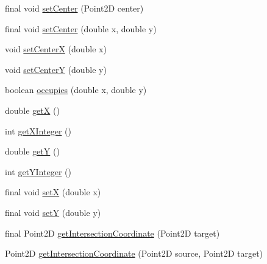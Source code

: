 \begin{DoxyCompactItemize}
\item 
final void \hyperlink{classorg_1_1tzi_1_1use_1_1gui_1_1views_1_1diagrams_1_1elements_1_1_placeable_node_aba9a1a5c62c3a4884918d943f66138fa}{set\-Center} (Point2\-D center)
\item 
final void \hyperlink{classorg_1_1tzi_1_1use_1_1gui_1_1views_1_1diagrams_1_1elements_1_1_placeable_node_ac8b271927328def828f3799aa3cccea7}{set\-Center} (double x, double y)
\item 
void \hyperlink{classorg_1_1tzi_1_1use_1_1gui_1_1views_1_1diagrams_1_1elements_1_1_placeable_node_ae77728c5033a4d84494bebf3216f273a}{set\-Center\-X} (double x)
\item 
void \hyperlink{classorg_1_1tzi_1_1use_1_1gui_1_1views_1_1diagrams_1_1elements_1_1_placeable_node_a402c26ca8766f236e79b091798a827a7}{set\-Center\-Y} (double y)
\item 
boolean \hyperlink{classorg_1_1tzi_1_1use_1_1gui_1_1views_1_1diagrams_1_1elements_1_1_placeable_node_a5f958afb2688448b1a1eedc1a32d1ad3}{occupies} (double x, double y)
\item 
double \hyperlink{classorg_1_1tzi_1_1use_1_1gui_1_1views_1_1diagrams_1_1elements_1_1_placeable_node_a9896f7614afee00b458f36f31844c5c4}{get\-X} ()
\item 
int \hyperlink{classorg_1_1tzi_1_1use_1_1gui_1_1views_1_1diagrams_1_1elements_1_1_placeable_node_aff7606ef1a9552fbf84cea3d77d76250}{get\-X\-Integer} ()
\item 
double \hyperlink{classorg_1_1tzi_1_1use_1_1gui_1_1views_1_1diagrams_1_1elements_1_1_placeable_node_a07031d68a4c5db1c981ab2ae736ac5c9}{get\-Y} ()
\item 
int \hyperlink{classorg_1_1tzi_1_1use_1_1gui_1_1views_1_1diagrams_1_1elements_1_1_placeable_node_af8294cc538ac4dd10d354fded4fde9ba}{get\-Y\-Integer} ()
\item 
final void \hyperlink{classorg_1_1tzi_1_1use_1_1gui_1_1views_1_1diagrams_1_1elements_1_1_placeable_node_a738326154df6bbd276c04af778870a2f}{set\-X} (double x)
\item 
final void \hyperlink{classorg_1_1tzi_1_1use_1_1gui_1_1views_1_1diagrams_1_1elements_1_1_placeable_node_a621d044c7519c5d209bed0b328de73ea}{set\-Y} (double y)
\item 
final Point2\-D \hyperlink{classorg_1_1tzi_1_1use_1_1gui_1_1views_1_1diagrams_1_1elements_1_1_placeable_node_a276db8db4bac826bb36b93d34ffdc62d}{get\-Intersection\-Coordinate} (Point2\-D target)
\item 
Point2\-D \hyperlink{classorg_1_1tzi_1_1use_1_1gui_1_1views_1_1diagrams_1_1elements_1_1_placeable_node_a85d9c6e6450c75620682440be9ce343a}{get\-Intersection\-Coordinate} (Point2\-D source, Point2\-D target)

\end{DoxyCompactItemize}
